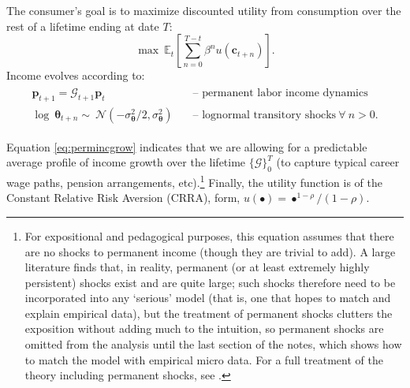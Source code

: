 \documentclass[titlepage, headings=optiontotocandhead]{Resources/texmf-local/tex/latex/econtex}
\begin{document}
The consumer's goal is to maximize discounted utility from consumption over the rest of a lifetime ending at date $T$:
  \begin{equation}\label{eq:MaxProb}
    \max~{\mathbb{E}}_{t}\left[\sum_{n=0}^{T-t}\beta^{n} u(\mathbf{c}_{t+n})\right].
  \end{equation}
Income evolves according to:
  \begin{equation}\begin{gathered}\begin{aligned}
        \mathbf{p}_{t+1}   = \mathcal{G}_{t+1}\mathbf{p}_{t}                                        & \text{~~ -- permanent labor income dynamics} \label{eq:permincgrow}
        \\ \log ~ \pmb{\theta}_{t+n}  \sim ~\mathcal{N}(-\sigma_{\pmb{\theta}}^{2}/2,\sigma_{\pmb{\theta}}^{2}) & \text{~~ -- lognormal transitory shocks}~\forall~n>0 .
      \end{aligned}\end{gathered}\end{equation}

Equation \eqref{eq:permincgrow} indicates that we are allowing for a predictable average profile of income growth over the lifetime $\{\mathcal{G}\}_{0}^{T}$ (to capture typical career wage paths, pension arrangements, etc).\footnote{For expositional and pedagogical purposes, this equation assumes that there are no shocks to permanent income (though they are trivial to add).  A large literature finds that, in reality, permanent (or at least extremely highly persistent) shocks exist and are quite large; such shocks therefore need to be incorporated into any `serious' model (that is, one that hopes to match and explain empirical data), but the treatment of permanent shocks clutters the exposition without adding much to the intuition, so permanent shocks are omitted from the analysis until the last section of the notes, which shows how to match the model with empirical micro data.  For a full treatment of the theory including permanent shocks, see \cite{BufferStockTheory}.}  Finally, the utility function is of the Constant Relative Risk Aversion (CRRA), form, $u(\bullet) = \bullet^{1-\rho}/(1-\rho)$.
\end{document}
